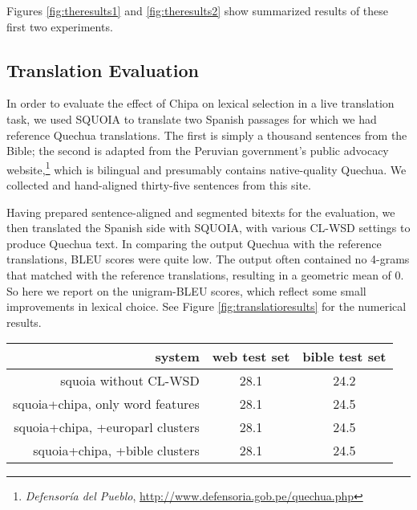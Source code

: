 Figures \ref{fig:theresults1} and \ref{fig:theresults2} show 
summarized results of these first two experiments.

\subsection{Translation Evaluation}
In order to evaluate the effect of Chipa on lexical selection in a live
translation task, we used SQUOIA to translate two Spanish passages for which we
had reference Quechua translations. The first is simply a thousand sentences
from the Bible; the second is adapted from the Peruvian government's public
advocacy website,\footnote{\emph{Defensoría del Pueblo},
\url{http://www.defensoria.gob.pe/quechua.php}} which is bilingual and
presumably contains native-quality Quechua. We collected and hand-aligned
thirty-five sentences from this site.

Having prepared sentence-aligned and segmented bitexts for the evaluation,
we then translated the Spanish side with SQUOIA, with various CL-WSD settings
to produce Quechua text. In comparing the output Quechua with the reference
translations, BLEU scores were quite low. The output often contained no 4-grams
that matched with the reference translations, resulting in a geometric mean of
0. So here we report on the unigram-BLEU scores, which reflect some small
improvements in lexical choice.
See Figure \ref{fig:translatioresults} for the numerical results.

\begin{figure*}[t!]
  \begin{center}
  \begin{tabular}{|r|c|c|}
    \hline
    system                           & web test set & bible test set  \\
    \hline
    squoia without CL-WSD            & 28.1         & 24.2            \\
    squoia+chipa, only word features & 28.1         & 24.5            \\
    squoia+chipa, +europarl clusters & 28.1         & 24.5            \\
    squoia+chipa, +bible    clusters & 28.1         & 24.5            \\
    \hline
  \end{tabular}
  \end{center}
  \caption{BLEU-1 scores (modified unigram precision) for the various CL-WSD
  settings of SQUOIA on the two different Spanish-Quechua test sets.}
\label{fig:translatioresults}
\end{figure*}

